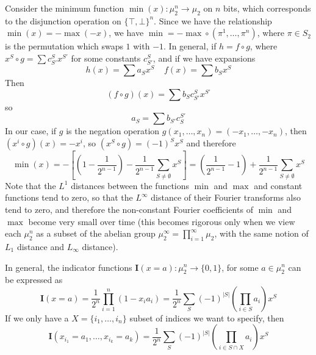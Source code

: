 \begin{example}
    Consider the minimum function $\min(x): \mu_2^n \to \mu_2$ on $n$ bits, which corresponds to the disjunction operation on $\{ \top, \bot \}^n$. Since we have the relationship $\min(x) = - \max(-x)$, we have $\min = - \max \circ (\pi^1, \dots, \pi^n)$, where $\pi \in S_2$ is the permutation which swaps $1$ with $-1$. In general, if $h = f \circ g$, where $x^S \circ g = \sum c^S_{S'} x^{S'}$ for some constants $c^S_{S'}$, and if we have expansions
    \[ h(x) = \sum a_S x^S\ \ \ \ \ f(x) = \sum b_S x^S \]
    Then
    \[ (f \circ g)(x) = \sum b_S c_{S'}^S x^{S'} \]
    so
    \[ a_S = \sum b_{S'} c^{S'}_S \]
    In our case, if $g$ is the negation operation $g(x_1, \dots, x_n) = (-x_1, \dots, -x_n)$, then $(x^i \circ g)(x) = -x^i$, so $(x^S \circ g) = (-1)^S x^S$ and therefore
    \[ \min(x) = - \left[ \left( 1 - \frac{1}{2^{n-1}} \right) - \frac{1}{2^{n-1}} \sum_{S \neq \emptyset} x^S \right] = \left( \frac{1}{2^{n-1}} - 1 \right) + \frac{1}{2^{n-1}} \sum_{S \neq \emptyset} x^S \]
    Note that the $L^1$ distances between the functions $\min$ and $\max$ and constant functions tend to zero, so that the $L^\infty$ distance of their Fourier transforms also tend to zero, and therefore the non-constant Fourier coefficients of $\min$ and $\max$ become very small over time (this becomes rigorous only when we view each $\mu_2^n$ as a subset of the abelian group $\mu_2^\infty = \prod_{i = 1}^\infty \mu_2$, with the same notion of $L_1$ distance and $L_\infty$ distance).
\end{example}

\begin{example}
    In general, the indicator functions $\mathbf{I}(x = a): \mu_2^n \to \{ 0, 1 \}$, for some $a \in \mu_2^n$ can be expressed as
    \[ \mathbf{I}(x = a) = \frac{1}{2^n} \prod_{i = 1}^n \left( 1 - x_i a_i \right) = \frac{1}{2^n} \sum_S (-1)^{|S|} \left( \prod_{i \in S} a_i \right) x^S \]
    If we only have a $X = \{ i_1, \dots, i_n \}$ subset of indices we want to specify, then
    \[ \mathbf{I}(x_{i_1} = a_1, \dots, x_{i_k} = a_k) = \frac{1}{2^n} \sum_S (-1)^{|S|} \left( \prod_{i \in S \cap  X} a_i \right) x^S \]
\end{example}

